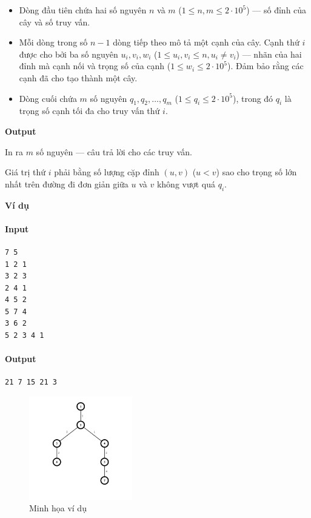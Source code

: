 \documentclass{article}
\begin{document}
\begin{itemize}
    \item Dòng đầu tiên chứa hai số nguyên $n$ và $m$ ($1 \le n,m \le 2 \cdot 10^5$) — số đỉnh của cây và số truy vấn.
    \item Mỗi dòng trong số $n-1$ dòng tiếp theo mô tả một cạnh của cây. 
    Cạnh thứ $i$ được cho bởi ba số nguyên $u_i, v_i, w_i$ ($1 \le u_i,v_i \le n, u_i \ne v_i$) — nhãn của hai đỉnh mà cạnh nối và trọng số của cạnh ($1 \le w_i \le 2 \cdot 10^5$). 
    Đảm bảo rằng các cạnh đã cho tạo thành một cây.
    \item Dòng cuối chứa $m$ số nguyên $q_1, q_2, \dots, q_m$ ($1 \le q_i \le 2 \cdot 10^5$), trong đó $q_i$ là trọng số cạnh tối đa cho truy vấn thứ $i$.
\end{itemize}

\textbf{Output}

In ra $m$ số nguyên — câu trả lời cho các truy vấn.  

Giá trị thứ $i$ phải bằng số lượng cặp đỉnh $(u,v)$ ($u < v$) sao cho trọng số lớn nhất trên đường đi đơn giản giữa $u$ và $v$ không vượt quá $q_i$.

\textbf{Ví dụ}

\paragraph{Input}
\begin{lstlisting}
7 5
1 2 1
3 2 3
2 4 1
4 5 2
5 7 4
3 6 2
5 2 3 4 1
\end{lstlisting}
\paragraph{Output}
\begin{lstlisting}
21 7 15 21 3 
\end{lstlisting}

\begin{figure}[h]
    \centering
    \includegraphics[width=0.4\textwidth]{img/b8/path_queries_1.png}
    \caption{Minh họa ví dụ}
\end{figure}
\end{document}
